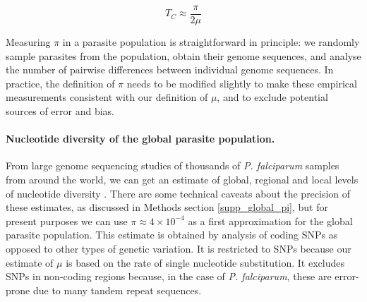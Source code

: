 \documentclass[_main.tex]{subfiles}
\begin{document}
\begin{equation}
T_C \approx \frac{\pi}{2 \mu}
\label{eq:main_Tc_pi}
\end{equation}

Measuring $\pi$ in a parasite population is straightforward in principle: we randomly sample parasites from the population, obtain their genome sequences, and analyse the number of pairwise differences between individual genome sequences. In practice,  the definition of $\pi$ needs to be modified slightly to make these empirical measurements consistent with our definition of $\mu$, and to exclude potential sources of error and bias.


\paragraph{Nucleotide diversity of the global parasite population.} 
\label{main_global_diversity_1}

From large genome sequencing studies of thousands of \textit{P. falciparum} samples from around the world, we can get an estimate of global, regional and local levels of nucleotide diversity  \cite{MalariaGEN2021,MalariaGEN2023}.  There are some technical caveats about the precision of these estimates, as discussed in Methods section \ref{supp_global_pi}, but for present purposes we can use $\pi \approx 4 \times 10^{-4}$ as a first approximation for the global parasite population.  This estimate is obtained by analysis of coding SNPs as opposed to other types of genetic variation.  It is restricted to SNPs because our estimate of $\mu$ is based on the rate of single nucleotide substitution.  It excludes SNPs in non-coding regions because, in the case of \textit{P. falciparum}, these are error-prone due to many tandem repeat sequences.  




\end{document}
